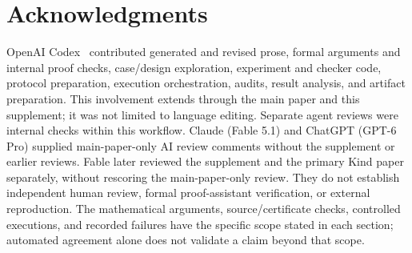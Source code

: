 \documentclass[11pt]{article}
\begin{document}






\section*{Acknowledgments}
OpenAI Codex~\cite{codex} contributed generated and revised prose,
formal arguments and internal proof checks, case/design exploration,
experiment and checker code, protocol preparation, execution orchestration,
audits, result analysis, and artifact preparation. This involvement extends through the main
paper and this supplement; it was not limited to language editing.
Separate agent reviews were internal checks within this workflow.
Claude (Fable 5.1) and ChatGPT (GPT-6 Pro) supplied main-paper-only AI
review comments without the supplement or earlier reviews. Fable later
reviewed the supplement and the primary Kind paper separately, without
rescoring the main-paper-only review.
They do not establish independent human review, formal proof-assistant
verification, or external reproduction. The mathematical arguments,
source/certificate checks, controlled executions, and recorded failures
have the specific scope stated in each section; automated agreement
alone does not validate a claim beyond that scope.
\end{document}
